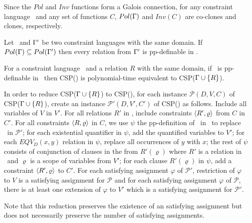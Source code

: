 \begin{cor}
Since the \(Pol\) and \(Inv\) functions form a Galois connection, for any
constraint language \mrelset\ and any set of functions \(C\), 
\(Pol(\Gamma)\) and \(Inv(C)\) are co-clones and clones, respectively.
\end{cor}

\begin{cor}
Let \mrelset\ and \(\Gamma'\) be two constraint languages with the same domain.
If \(Pol(\Gamma) \subseteq Pol(\Gamma')\) then every relation from \(\Gamma'\)  is 
pp-definable in \mrelset\@.
\end{cor}

\begin{theorem} 
For a constraint language \mrelset\ and a relation \(R\) with the same domain,
if \mR\ is pp-definable in \mrelset\ then CSP(\mrelset) is polynomial-time equivalent 
to CSP(\(\Gamma \cup \{{R}\}\))\@.
\end{theorem}

In order to reduce CSP(\(\Gamma \cup \{{R}\}\)) to CSP(\mrelset),
for each instance \(\mathcal{P}(D,V,C)\) of CSP(\(\Gamma \cup \{{R}\}\)),
create an instance \(\mathcal{P}'(D,V',C')\) of CSP(\mrelset) as follows.
Include all variables of \(V\) in \(V'\)\@.
For all relations \(R'\) in \mrelset, include constraints \(\langle R',\varrho \rangle\) from \(C\)
in \(C'\)\@. For all constraints \(\langle R,\varrho \rangle\) in \(C\), we use \(\psi\)
the pp-definition of \mR\ in \mrelset\ to replace \mR\ in \(\mathcal{P}'\);
for each existential quantifier in \(\psi\), add the quantified variables to \(V'\);
for each \(EQV_D(x,y)\) relation in \(\psi\), replace all occurrences of \(y\) with \(x\);
the rest of \(\psi\) consists of conjunction of clauses in the from \(R'(\varrho)\) where
\(R'\) is a relation in \mrelset\ and \(\varrho\) is a scope of variables from \(V'\);
for each clause \(R'(\varrho)\) in \(\psi\), add a constraint \(\langle R',\varrho \rangle\) to \(C'\)\@.
For each satisfying assignment \(\varphi\) of \(\mathcal{P'}\),
restriction of \(\varphi\) to \(V\) is a satisfying assignment for \(\mathcal{P}\)\@
and for each satisfying assignment \(\varphi\) of \(\mathcal{P}\),
there is at least one extension of \(\varphi\) to \(V'\) which
is a satisfying assignment for \(\mathcal{P}'\)\@.

Note that this reduction preserves the existence of an satisfying assignment
but does not necessarily preserve the number of satisfying assignments.

